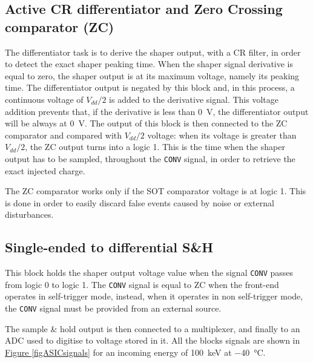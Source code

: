 
\subsection*{Active CR differentiator and Zero Crossing comparator (ZC)}
\label{zeroCrossing}

The differentiator task is to derive the shaper output, with a CR filter, in order to detect the exact shaper peaking time. When the shaper signal derivative is equal to zero, the shaper output is at its maximum voltage, namely its peaking time. The differentiator output is negated by this block and, in this process, a continuous voltage of $V_{dd}/2$ is added to the derivative signal. This voltage addition prevents that, if the derivative is less than \SI{0}{V}, the differentiator output will be always at \SI{0}{V}. The output of this block is then connected to the ZC comparator and compared with $V_{dd}/2$ voltage: when its voltage is greater than $V_{dd}/2$, the ZC output turns into a logic 1. This is the time when the shaper output has to be sampled, throughout the \texttt{CONV} signal, in order to retrieve the exact injected charge. 

\par
The ZC comparator works only if the SOT comparator voltage is at logic 1. This is done in order to easily discard false events caused by noise or external disturbances.


\subsection*{Single-ended to differential S\&H}
This block holds the shaper output voltage value when the signal \texttt{CONV} passes from logic 0 to logic 1. The \texttt{CONV} signal is equal to ZC when the front-end operates in self-trigger mode, instead, when it operates in non self-trigger mode, the \texttt{CONV} signal must be provided from an external source.

\par
The sample \& hold output is then connected to a multiplexer, and finally to an ADC used to digitise to voltage stored in it. All the blocks signals are shown in \hyperref[figASICsignals]{Figure \ref{figASICsignals}} for an incoming energy of \SI{100}{\kilo\electronvolt} at \SI{-40}{\celsius}.

